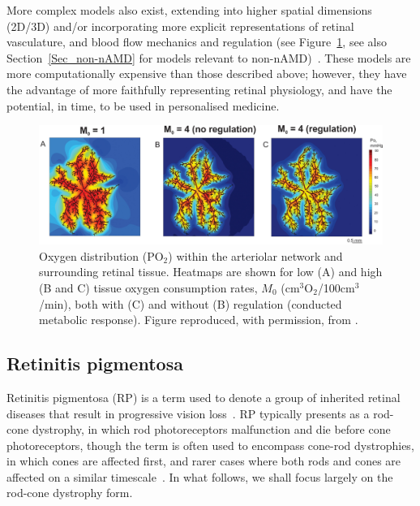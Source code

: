 \documentclass{article}
\begin{document}
More complex models also exist, extending into higher spatial dimensions (2D/3D) and/or incorporating more explicit representations of retinal vasculature, and blood flow mechanics and regulation (see Figure~\ref{Fig_Fry2020}, see also Section~\ref{Sec_non-nAMD} for models relevant to non-nAMD)~\cite{Aquah_et_al_2021,Arciero_et_al_2021,Causin_2015,Friedland_1978,Fry_et_al_2018,Fry_et_al_2020,Linsenmeier_and_Zhang_2017,McDougall_et_al_2012,Watson_et_al_2012}.
These models are more computationally expensive than those described above; however, they have the advantage of more faithfully representing retinal physiology, and have the potential, in time, to be used in personalised medicine.
%
\begin{figure}
\begin{center}
\includegraphics[scale=0.95]{Fry_et_al_2020_Fig_3_ABC}
\end{center}
\caption{Oxygen distribution (PO$_2$) within the arteriolar network and surrounding retinal tissue. Heatmaps are shown for low (A) and high (B and C) tissue oxygen consumption rates, $M_0$ (cm$^3$O$_2$/100cm$^3$/min), both with (C) and without (B) regulation (conducted metabolic response). Figure reproduced, with permission, from \citet{Fry_et_al_2020}.}
\label{Fig_Fry2020}
\end{figure}
%
%
\subsection{Retinitis pigmentosa}\label{Sec_RP}
%
Retinitis pigmentosa (RP) is a term used to denote a group of inherited retinal diseases that result in progressive vision loss~\cite{Hamel_2006,Hartong_et_al_2006}. RP typically presents as a rod-cone dystrophy, in which rod photoreceptors malfunction and die before cone photoreceptors, though the term is often used to encompass cone-rod dystrophies, in which cones are affected first, and rarer cases where both rods and cones are affected on a similar timescale~\cite{Hamel_2006,Hartong_et_al_2006}. In what follows, we shall focus largely on the rod-cone dystrophy form.
\end{document}
